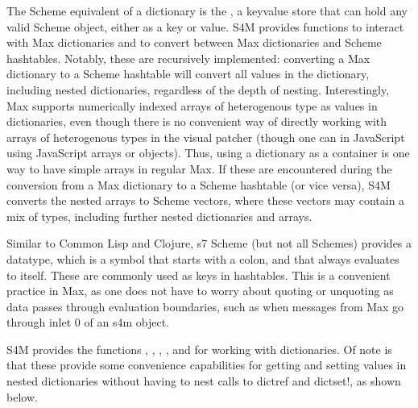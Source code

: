 \documentclass[letterpaper,10pt,english]{sphinxmanual}
\begin{document}
\sphinxAtStartPar
The Scheme equivalent of a dictionary is the , a key\sphinxhyphen{}value
store that can hold any valid Scheme object, either as a key or value.
S4M provides functions to interact with Max dictionaries and to
convert between Max dictionaries and Scheme hash\sphinxhyphen{}tables.
Notably, these are recursively implemented: converting a Max
dictionary to a Scheme hash\sphinxhyphen{}table will convert all values in the
dictionary, including nested dictionaries, regardless of the depth of nesting.
Interestingly, Max supports numerically indexed arrays of heterogenous type as values in dictionaries,
even though there is no convenient way of directly working with arrays of heterogenous types
in the visual patcher (though one can in JavaScript using JavaScript arrays or objects).
Thus, using a dictionary as a container is one way to have simple arrays in regular
Max. If these are encountered during the conversion from
a Max dictionary to a Scheme hash\sphinxhyphen{}table (or vice versa), S4M converts the nested arrays
to Scheme vectors, where these vectors may contain a mix of types,
including further nested dictionaries and arrays.

\sphinxAtStartPar
Similar to Common Lisp and Clojure, s7 Scheme (but not all Schemes) provides
a  data\sphinxhyphen{}type, which is a symbol that starts with a colon, and that
always evaluates to itself. These are commonly used as keys in
hash\sphinxhyphen{}tables. This is a convenient practice in Max, as one does not have to worry about
quoting or unquoting as data passes through evaluation boundaries, such
as when messages from Max go through inlet 0 of an s4m object.

\sphinxAtStartPar
S4M provides the functions , ,
, , and 
for working with dictionaries.
Of note is that these provide some convenience capabilities
for getting and setting values in nested dictionaries without having to nest
calls to dict\sphinxhyphen{}ref and dict\sphinxhyphen{}set!, as shown below.
\end{document}
